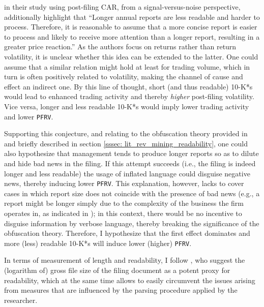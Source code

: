 \textcite[2157]{HuangZangZheng14} in their study using post-filing CAR, from a signal-versus-noise perspective, additionally highlight that \enquote{Longer annual reports are less readable and harder to process. Therefore, it is reasonable to assume that a more concise report is easier to process and likely to receive more attention than a longer report, resulting in a greater price reaction.} As the authors focus on returns rather than return volatility, it is unclear whether this idea can be extended to the latter. One could assume that a similar relation might hold  at least for trading volume, which in turn is often positively related to volatility, making the channel of cause and effect an indirect one. By this line of thought, short (and thus readable) 10-K*s would lead to enhanced trading activity and thereby \textit{higher} post-filing volatility. Vice versa, longer and less readable 10-K*s would imply lower trading activity and lower \texttt{PFRV}. 

Supporting this conjecture, and relating to the obfuscation theory provided in \textcite[221]{Li2008} and briefly described in section \ref{sssec: lit_rev_mining_readability}, one could also hypothesize that management tends to produce longer reports so as to dilute and hide bad news in the filing. If this attempt succeeds (i.e., the filing is indeed longer and less readable) the usage of inflated language could disguise negative news, thereby inducing lower \texttt{PFRV}. This explanation, however, lacks to cover cases in which report size does not coincide with the presence of bad news (e.g., a report might be longer simply due to the complexity of the business the firm operates in, as indicated in \textcite{LM-meta-2016}); in this context, there would be no incentive to disguise information by verbose language, thereby breaking the significance of the obfuscation theory. Therefore, I hypothesize that the first effect dominates and more (less) readable 10-K*s will induce lower (higher) \texttt{PFRV}.

In terms of measurement of length and readability, I follow \textcite{Loughran2014}, who suggest the (logarithm of) gross file size of the filing document as a potent proxy for readability, which at the same time allows to easily circumvent the issues arising from measures that are influenced by the parsing procedure applied by the researcher. 


